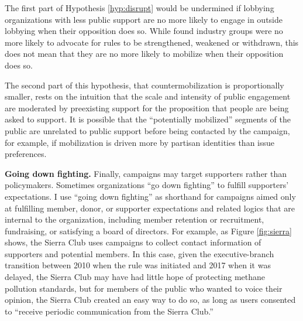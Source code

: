 \begin{subhyp}
The first part of Hypothesis \ref{hyp:disrupt} would be undermined if lobbying organizations with less public support are no more likely to engage in outside lobbying when their opposition does so. While \citet{Potter2017} found industry groups were no more likely to advocate for rules to be strengthened, weakened or withdrawn, this does not mean that they are no more likely to mobilize when their opposition does so.

The second part of this hypothesis, that countermobilization is proportionally smaller, rests on the intuition that the scale and intensity of public engagement are moderated by preexisting support for the proposition that people are being asked to support. It is possible that the ``potentially mobilized'' segments of the public are unrelated to public support before being contacted by the campaign, for example, if mobilization is driven more by partisan identities than issue preferences.

\textbf{Going down fighting.} Finally, campaigns may target supporters rather than policymakers. Sometimes organizations ``go down fighting'' to fulfill supporters' expectations.
I use ``going down fighting'' as shorthand for campaigns aimed only at fulfilling member, donor, or supporter expectations and related logics that are internal to the organization, including member retention or recruitment, fundraising, or satisfying a board of directors. For example, as Figure \ref{fig:sierra} shows, the Sierra Club uses campaigns to collect contact information of supporters and potential members. In this case, given the executive-branch transition between 2010 when the rule was initiated and 2017 when it was delayed, the Sierra Club may have had little hope of protecting methane pollution standards, but for members of the public who wanted to voice their opinion, the Sierra Club created an easy way to do so, as long as users consented to ``receive periodic communication from the Sierra Club.'' 


\end{subhyp}
